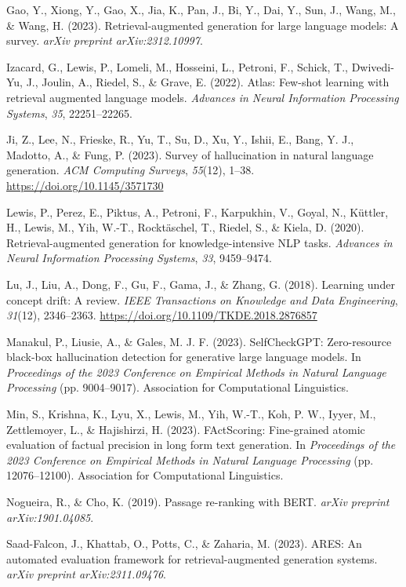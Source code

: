 \documentclass[12pt,a4paper]{report}
\begin{document}
\begin{flushleft}
Gao, Y., Xiong, Y., Gao, X., Jia, K., Pan, J., Bi, Y., Dai, Y., Sun, J., Wang, M., \& Wang, H. (2023). Retrieval-augmented generation for large language models: A survey. \textit{arXiv preprint arXiv:2312.10997}.

Izacard, G., Lewis, P., Lomeli, M., Hosseini, L., Petroni, F., Schick, T., Dwivedi-Yu, J., Joulin, A., Riedel, S., \& Grave, E. (2022). Atlas: Few-shot learning with retrieval augmented language models. \textit{Advances in Neural Information Processing Systems}, \textit{35}, 22251--22265.

Ji, Z., Lee, N., Frieske, R., Yu, T., Su, D., Xu, Y., Ishii, E., Bang, Y. J., Madotto, A., \& Fung, P. (2023). Survey of hallucination in natural language generation. \textit{ACM Computing Surveys}, \textit{55}(12), 1--38. \url{https://doi.org/10.1145/3571730}

Lewis, P., Perez, E., Piktus, A., Petroni, F., Karpukhin, V., Goyal, N., K{\"u}ttler, H., Lewis, M., Yih, W.-T., Rockt{\"a}schel, T., Riedel, S., \& Kiela, D. (2020). Retrieval-augmented generation for knowledge-intensive NLP tasks. \textit{Advances in Neural Information Processing Systems}, \textit{33}, 9459--9474.

Lu, J., Liu, A., Dong, F., Gu, F., Gama, J., \& Zhang, G. (2018). Learning under concept drift: A review. \textit{IEEE Transactions on Knowledge and Data Engineering}, \textit{31}(12), 2346--2363. \url{https://doi.org/10.1109/TKDE.2018.2876857}

Manakul, P., Liusie, A., \& Gales, M. J. F. (2023). SelfCheckGPT: Zero-resource black-box hallucination detection for generative large language models. In \textit{Proceedings of the 2023 Conference on Empirical Methods in Natural Language Processing} (pp. 9004--9017). Association for Computational Linguistics.

Min, S., Krishna, K., Lyu, X., Lewis, M., Yih, W.-T., Koh, P. W., Iyyer, M., Zettlemoyer, L., \& Hajishirzi, H. (2023). FActScoring: Fine-grained atomic evaluation of factual precision in long form text generation. In \textit{Proceedings of the 2023 Conference on Empirical Methods in Natural Language Processing} (pp. 12076--12100). Association for Computational Linguistics.

Nogueira, R., \& Cho, K. (2019). Passage re-ranking with BERT. \textit{arXiv preprint arXiv:1901.04085}.

Saad-Falcon, J., Khattab, O., Potts, C., \& Zaharia, M. (2023). ARES: An automated evaluation framework for retrieval-augmented generation systems. \textit{arXiv preprint arXiv:2311.09476}.


\end{flushleft}
\end{document}
